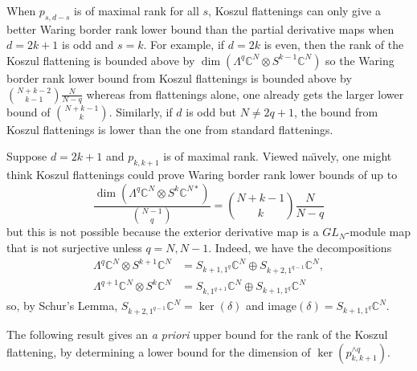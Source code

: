 \documentclass{toc}
\newcommand{\bbC}{\mathbb{C}}
\def\BC{\mathbb C}
\def\tdim{\operatorname{dim}}
\def\tim{\mathrm{image}}
\def\tker{\operatorname{ker}}
\begin{document}
When $p_{s,d-s}$ is of maximal rank for all $s$, Koszul flattenings can only give a better Waring border rank lower bound than the partial derivative maps when $d=2k+1$ is odd and $s=k$. For example, if $d=2k$ is even, then the rank of the Koszul flattening is bounded above by $\dim \left( \Lambda^q \bbC^N  \otimes S^{k-1}\bbC^N \right)$ so the   Waring border rank lower bound from Koszul flattenings is bounded above by $\binom{N+k-2}{k-1}\frac N{N-q}$ whereas from flattenings alone, one already gets the larger lower bound of $\binom{N+k-1}{k}$. Similarly, if $d$ is odd but $N \neq 2q+1$, the bound from Koszul flattenings is lower than the one from standard flattenings. 

Suppose $d=2k+1$ and  $p_{k,k+1}$ is of maximal rank. Viewed na\"\i vely, one might think Koszul flattenings could prove Waring border rank lower bounds of up to
$$
\frac{\tdim ( \Lambda^q \BC^N \otimes S^k\BC^{N*})}{\binom{N-1}{q}}=\binom{N+k-1}k \frac N{N-q}
$$
but this is not possible because the exterior derivative map is a $GL_N$-module map  that is not surjective unless $q = N,N-1$. Indeed, we have
the decompositions
\begin{align*} 
\Lambda^q \BC^N \otimes S^{k+1} \BC^N &= S_{k+1,1^q}\BC^N\oplus S_{k+2,1^{q-1}}\BC^N, \\
\Lambda^{q+1} \BC^N\otimes S^{k } \BC^N &= S_{k ,1^{q+1}}\BC^N\oplus S_{k+1,1^{q }}\BC^N
\end{align*}
so, by Schur's Lemma, $S_{k+2,1^{q-1}}\BC^N =  \tker (\delta)$ and   $\tim (\delta) = S_{k+1,1^{q }}\BC^N$.
 
The following result gives an \emph{a priori} upper bound for the rank of the Koszul flattening, by determining a lower bound for the dimension of $\ker(p_{k,k+1}^{\wedge q})$.
\end{document}

